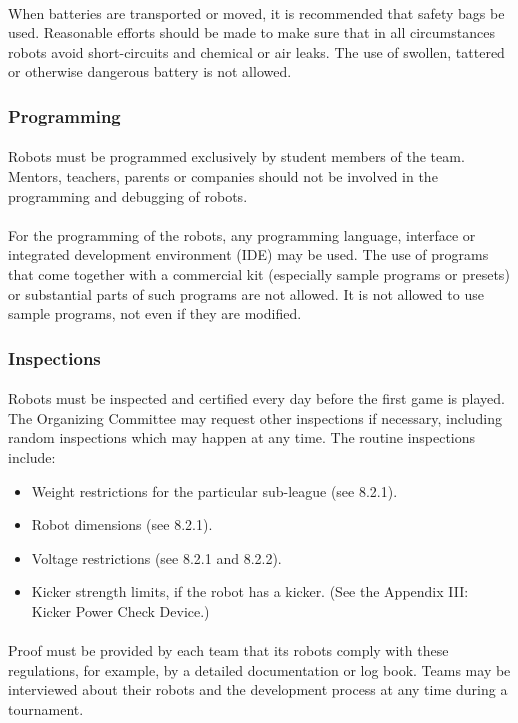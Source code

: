 \documentclass{article}
\newcommand*{\p}{\paragraph{}}
\begin{document}
\p When batteries are transported or moved, it is recommended that safety bags be
used. Reasonable efforts should be made to make sure that in all circumstances
robots avoid short-circuits and chemical or air leaks. The use of
swollen, tattered or otherwise dangerous battery is not allowed.


\subsubsection{Programming \label{ref-058}}

\p Robots must be programmed exclusively by student members of the team. Mentors,
teachers, parents or companies should not be involved in the programming and
debugging of robots.

\p For the programming of the robots, any programming language, interface or
integrated development environment (IDE) may be used. The use of programs that
come together with a commercial kit (especially sample programs or presets) or
substantial parts of such programs are not allowed. It is not allowed to use
sample programs, not even if they are modified.

\subsubsection{Inspections \label{ref-059}}

\p Robots must be inspected and certified every day before the first game is
played. The Organizing Committee may request other inspections if necessary,
including random inspections which may happen at any time. The routine
inspections include:

\begin{itemize}
\item Weight restrictions for the particular sub-league (see 8.2.1).

\item Robot dimensions (see 8.2.1).

\item Voltage restrictions (see 8.2.1 and 8.2.2).

\item Kicker strength limits, if the robot has a kicker. (See the Appendix III: Kicker Power Check Device.)
\end{itemize}

\p Proof must be provided by each team that its robots comply with these
regulations, for example, by a detailed documentation or log book. Teams may be
interviewed about their robots and the development process at any time during a
tournament.
\end{document}
